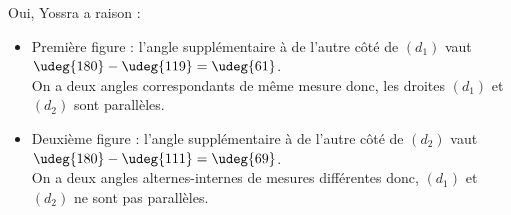    Oui, Yossra a raison : \\
   \begin{itemize}
      \item Première figure : l'angle supplémentaire à  de l'autre côté de $(d_1)$ vaut $\udeg{180}-\udeg{119} =\udeg{61}$. \\
      On a deux angles correspondants de même mesure donc, {\blue les droites $(d_1)$ et $(d_2)$ sont parallèles}.
      \item Deuxième figure : l'angle supplémentaire à  de l'autre côté de $(d_2)$ vaut $\udeg{180}-\udeg{111} =\udeg{69}$. \\
      On a deux angles alternes-internes de mesures différentes donc, {\blue $(d_1)$ et $(d_2)$ ne sont pas parallèles}.
   \end{itemize}
